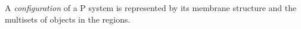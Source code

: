 A {\em configuration} of a P system is represented by its membrane structure and the multisets of objects in the regions.